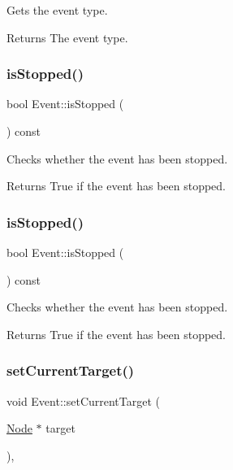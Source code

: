 Gets the event type.

\begin{DoxyReturn}{Returns}
The event type. 
\end{DoxyReturn}
\mbox{\label{classEvent_a48334dfff0921eb7cddeb15ad1a2c7b6}} 
\subsubsection{\texorpdfstring{is\+Stopped()}{isStopped()}\hspace{0.1cm}{\footnotesize\ttfamily [1/2]}}
{\footnotesize\ttfamily bool Event\+::is\+Stopped (\begin{DoxyParamCaption}{ }\end{DoxyParamCaption}) const\hspace{0.3cm}{\ttfamily [inline]}}

Checks whether the event has been stopped.

\begin{DoxyReturn}{Returns}
True if the event has been stopped. 
\end{DoxyReturn}
\mbox{\label{classEvent_a48334dfff0921eb7cddeb15ad1a2c7b6}} 
\subsubsection{\texorpdfstring{is\+Stopped()}{isStopped()}\hspace{0.1cm}{\footnotesize\ttfamily [2/2]}}
{\footnotesize\ttfamily bool Event\+::is\+Stopped (\begin{DoxyParamCaption}{ }\end{DoxyParamCaption}) const\hspace{0.3cm}{\ttfamily [inline]}}

Checks whether the event has been stopped.

\begin{DoxyReturn}{Returns}
True if the event has been stopped. 
\end{DoxyReturn}
\mbox{\label{classEvent_a60e1b57b9a97d67300a553205814ccf0}} 
\subsubsection{\texorpdfstring{set\+Current\+Target()}{setCurrentTarget()}\hspace{0.1cm}{\footnotesize\ttfamily [1/2]}}
{\footnotesize\ttfamily void Event\+::set\+Current\+Target (\begin{DoxyParamCaption}\item[{\hyperlink{classNode}{Node} $\ast$}]{target }\end{DoxyParamCaption})\hspace{0.3cm}{\ttfamily [inline]}, {\ttfamily [protected]}}

